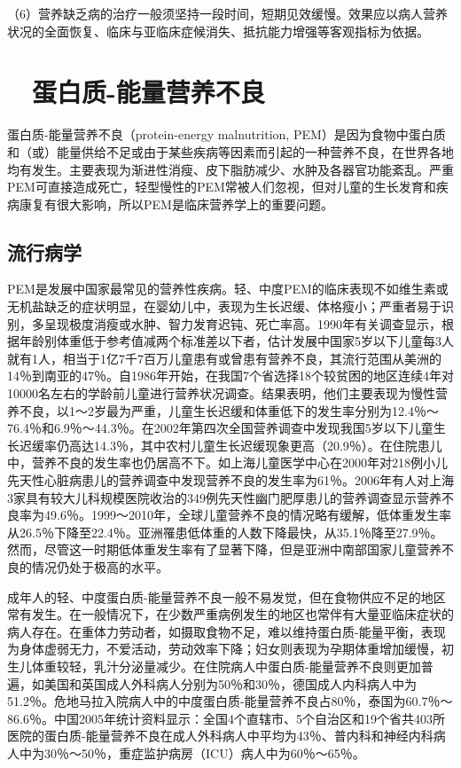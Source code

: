 （6）营养缺乏病的治疗一般须坚持一段时间，短期见效缓慢。效果应以病人营养状况的全面恢复、临床与亚临床症候消失、抵抗能力增强等客观指标为依据。

\hypertarget{text00003.htmlux5cux23mllj8}{%
\section{　蛋白质-能量营养不良}\label{text00003.htmlux5cux23mllj8}}

蛋白质-能量营养不良（protein-energy malnutrition,
PEM）是因为食物中蛋白质和（或）能量供给不足或由于某些疾病等因素而引起的一种营养不良，在世界各地均有发生。主要表现为渐进性消瘦、皮下脂肪减少、水肿及各器官功能紊乱。严重PEM可直接造成死亡，轻型慢性的PEM常被人们忽视，但对儿童的生长发育和疾病康复有很大影响，所以PEM是临床营养学上的重要问题。

\hypertarget{text00003.htmlux5cux23mllj9}{%
\subsection{流行病学}\label{text00003.htmlux5cux23mllj9}}

PEM是发展中国家最常见的营养性疾病。轻、中度PEM的临床表现不如维生素或无机盐缺乏的症状明显，在婴幼儿中，表现为生长迟缓、体格瘦小；严重者易于识别，多呈现极度消瘦或水肿、智力发育迟钝、死亡率高。1990年有关调查显示，根据年龄别体重低于参考值减两个标准差以下者，估计发展中国家5岁以下儿童每3人就有1人，相当于1亿7千7百万儿童患有或曾患有营养不良，其流行范围从美洲的14％到南亚的47％。自1986年开始，在我国7个省选择18个较贫困的地区连续4年对10000名左右的学龄前儿童进行营养状况调查。结果表明，他们主要表现为慢性营养不良，以1～2岁最为严重，儿童生长迟缓和体重低下的发生率分别为12.4％～76.4％和6.9％～44.3％。在2002年第四次全国营养调查中发现我国5岁以下儿童生长迟缓率仍高达14.3％，其中农村儿童生长迟缓现象更高（20.9％）。在住院患儿中，营养不良的发生率也仍居高不下。如上海儿童医学中心在2000年对218例小儿先天性心脏病患儿的营养调查中发现营养不良的发生率为61％。2006年有人对上海3家具有较大儿科规模医院收治的349例先天性幽门肥厚患儿的营养调查显示营养不良率为49.6％。1999～2010年，全球儿童营养不良的情况略有缓解，低体重发生率从26.5％下降至22.4％。亚洲罹患低体重的人数下降最快，从35.1％降至27.9％。然而，尽管这一时期低体重发生率有了显著下降，但是亚洲中南部国家儿童营养不良的情况仍处于极高的水平。

成年人的轻、中度蛋白质-能量营养不良一般不易发觉，但在食物供应不足的地区常有发生。在一般情况下，在少数严重病例发生的地区也常伴有大量亚临床症状的病人存在。在重体力劳动者，如摄取食物不足，难以维持蛋白质-能量平衡，表现为身体虚弱无力，不爱活动，劳动效率下降；妇女则表现为孕期体重增加缓慢，初生儿体重较轻，乳汁分泌量减少。在住院病人中蛋白质-能量营养不良则更加普遍，如美国和英国成人外科病人分别为50％和30％，德国成人内科病人中为51.2％。危地马拉入院病人中的中度蛋白质-能量营养不良占80％，泰国为60.7％～86.6％。中国2005年统计资料显示：全国4个直辖市、5个自治区和19个省共403所医院的蛋白质-能量营养不良在成人外科病人中平均为43％、普内科和神经内科病人中为30％～50％，重症监护病房（ICU）病人中为60％～65％。

